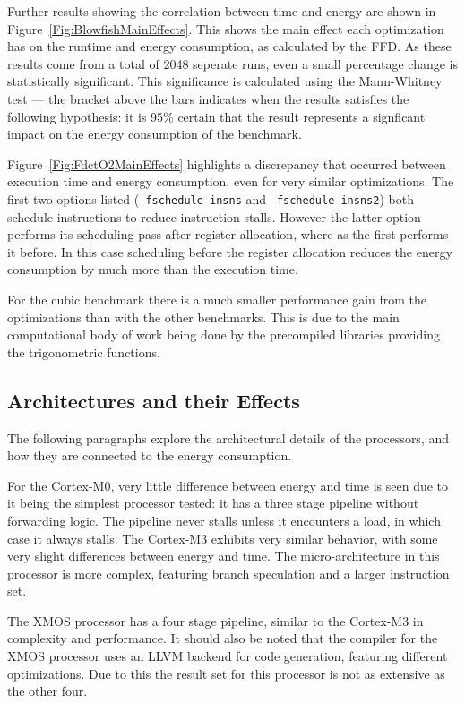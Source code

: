\documentclass[twocolumn]{article}
\begin{document}
Further results showing the correlation between time and energy are shown in Figure~\ref{Fig:BlowfishMainEffects}. This shows the main effect each optimization has on the runtime and energy consumption, as calculated by the FFD. As these results come from a total of 2048 seperate runs, even a small percentage change is statistically significant. This significance is calculated using the Mann-Whitney test --- the bracket above the bars indicates when the results satisfies the following hypothesis: it is 95\% certain that the result represents a signficant impact on the energy consumption of the benchmark.

Figure~\ref{Fig:FdctO2MainEffects} highlights a discrepancy that occurred between execution time and energy consumption, even for very similar optimizations. The first two options listed (\texttt{-fschedule-insns} and \texttt{-fschedule-insns2}) both schedule instructions to reduce instruction stalls. However the latter option performs its scheduling pass after register allocation, where as the first performs it before. In this case scheduling before the register allocation reduces the energy consumption by much more than the execution time.

For the cubic benchmark there is a much smaller performance gain from the optimizations than with the other benchmarks. This is due to the main computational body of work being done by the precompiled libraries providing the trigonometric functions.

\subsection{Architectures and their Effects}

The following paragraphs explore the architectural details of the processors, and how they are connected to the energy consumption.

For the Cortex-M0, very little difference between energy and time is seen due to it being the simplest processor tested: it has a three stage pipeline without forwarding logic. The pipeline never stalls unless it encounters a load, in which case it always stalls. The Cortex-M3 exhibits very similar behavior, with some very slight differences between energy and time. The micro-architecture in this processor is more complex, featuring branch speculation and a larger instruction set\cite{Yiu2010}.

The XMOS processor has a four stage pipeline, similar to the Cortex-M3 in complexity and performance. It should also be noted that the compiler for the XMOS processor uses an LLVM backend for code generation, featuring different optimizations. Due to this the result set for this processor is not as extensive as the other four.
\end{document}
